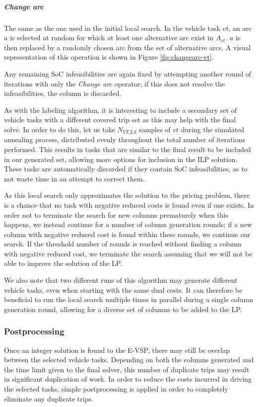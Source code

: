 \documentclass[]{article}
\begin{document}
\subparagraph{Change arc} The same as the one used in the initial local search. In the vehicle task $vt$, an arc $a$ is selected at random for which at least one alternative arc exist in $A_{vt}$. $a$ is then replaced by a randomly chosen arc from the set of alternative arcs. A visual representation of this operation is shown in Figure \ref{fig:changearc-vt}. 

\noindent Any remaining SoC infeasibilities are again fixed by attempting another round of iterations with only the \textit{Change arc} operator; if this does not resolve the infeasibilities, the column is discarded. 

As with the labeling algorithm, it is interesting to include a secondary set of vehicle tasks with a different covered trip set as this may help with the final solve. In order to do this, let us take $N_{\textit{VT,LS}}$ samples of $vt$ during the simulated annealing process, distributed evenly throughout the total number of iterations performed. This results in tasks that are similar to the final result to be included in our generated set, allowing more options for inclusion in the ILP solution. These tasks are automatically discarded if they contain SoC infeasibilities, as to not waste time in an attempt to correct them.

As this local search only approximates the solution to the pricing problem, there is a chance that no task with negative reduced costs is found even if one exists. In order not to terminate the search for new columns prematurely when this happens, we instead continue for a number of column generation rounds; if a new column with negative reduced cost is found within these rounds, we continue our search. If the threshold number of rounds is reached without finding a column with negative reduced cost, we terminate the search assuming that we will not be able to improve the solution of the LP.

We also note that two different runs of this algorithm may generate different vehicle tasks, even when starting with the same dual costs. It can therefore be beneficial to run the local search multiple times in parallel during a single column generation round, allowing for a diverse set of columns to be added to the LP. 

\subsubsection{Postprocessing} \label{sec:evsp-postprocessing}
Once an integer solution is found to the E-VSP, there may still be overlap between the selected vehicle tasks. Depending on both the columns generated and the time limit given to the final solver, this number of duplicate trips may result in significant duplication of work. In order to reduce the costs incurred in driving the selected tasks, simple postprocessing is applied in order to completely eliminate any duplicate trips. 
\end{document}
